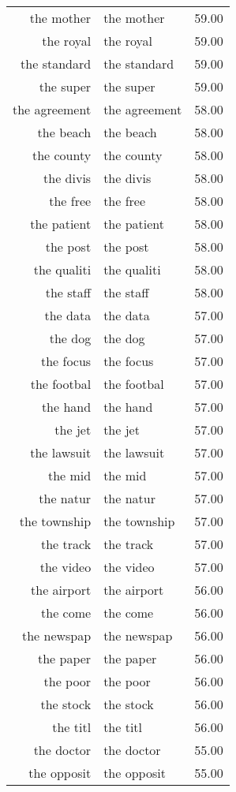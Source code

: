 \begin{table}[ht]
\begin{tabular}{rlr}
  the mother & the mother & 59.00 \\ 
  the royal & the royal & 59.00 \\ 
  the standard & the standard & 59.00 \\ 
  the super & the super & 59.00 \\ 
  the agreement & the agreement & 58.00 \\ 
  the beach & the beach & 58.00 \\ 
  the county & the county & 58.00 \\ 
  the divis & the divis & 58.00 \\ 
  the free & the free & 58.00 \\ 
  the patient & the patient & 58.00 \\ 
  the post & the post & 58.00 \\ 
  the qualiti & the qualiti & 58.00 \\ 
  the staff & the staff & 58.00 \\ 
  the data & the data & 57.00 \\ 
  the dog & the dog & 57.00 \\ 
  the focus & the focus & 57.00 \\ 
  the footbal & the footbal & 57.00 \\ 
  the hand & the hand & 57.00 \\ 
  the jet & the jet & 57.00 \\ 
  the lawsuit & the lawsuit & 57.00 \\ 
  the mid & the mid & 57.00 \\ 
  the natur & the natur & 57.00 \\ 
  the township & the township & 57.00 \\ 
  the track & the track & 57.00 \\ 
  the video & the video & 57.00 \\ 
  the airport & the airport & 56.00 \\ 
  the come & the come & 56.00 \\ 
  the newspap & the newspap & 56.00 \\ 
  the paper & the paper & 56.00 \\ 
  the poor & the poor & 56.00 \\ 
  the stock & the stock & 56.00 \\ 
  the titl & the titl & 56.00 \\ 
  the doctor & the doctor & 55.00 \\ 
  the opposit & the opposit & 55.00 \\ 

\end{tabular}
\end{table}
